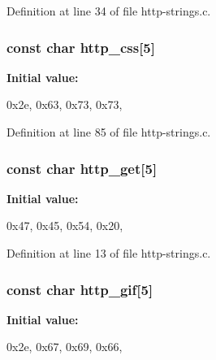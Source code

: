 Definition at line 34 of file http-\/strings.c.

\hypertarget{http-strings_8c_ac0d021741ad67c52f199e8a22037ac8e}{
\subsubsection[{http\_\-css}]{\setlength{\rightskip}{0pt plus 5cm}const char {\bf http\_\-css}\mbox{[}5\mbox{]}}}
\label{http-strings_8c_ac0d021741ad67c52f199e8a22037ac8e}
{\bfseries Initial value:}
\begin{DoxyCode}
 

{0x2e, 0x63, 0x73, 0x73, }
\end{DoxyCode}


Definition at line 85 of file http-\/strings.c.

\hypertarget{http-strings_8c_aeab14be7c9393694bc1d1e858cd0f512}{
\subsubsection[{http\_\-get}]{\setlength{\rightskip}{0pt plus 5cm}const char {\bf http\_\-get}\mbox{[}5\mbox{]}}}
\label{http-strings_8c_aeab14be7c9393694bc1d1e858cd0f512}
{\bfseries Initial value:}
\begin{DoxyCode}
 

{0x47, 0x45, 0x54, 0x20, }
\end{DoxyCode}


Definition at line 13 of file http-\/strings.c.

\hypertarget{http-strings_8c_a21f4d6b0759786044bce910d140df3b7}{
\subsubsection[{http\_\-gif}]{\setlength{\rightskip}{0pt plus 5cm}const char {\bf http\_\-gif}\mbox{[}5\mbox{]}}}
\label{http-strings_8c_a21f4d6b0759786044bce910d140df3b7}
{\bfseries Initial value:}
\begin{DoxyCode}
 

{0x2e, 0x67, 0x69, 0x66, }
\end{DoxyCode}


